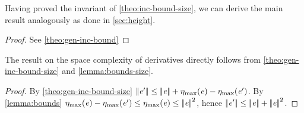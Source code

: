 Having proved the invariant of \cref{theo:inc-bound-size}, we can derive the main result analogously as done in \cref{sec:height}.
\begin{proof}
 See \cref{theo:gen-inc-bound}
\end{proof}

The result on the space complexity of derivatives directly follows from  \cref{theo:gen-inc-bound-size} and \cref{lemma:bounds-size}.


\begin{proof}
 By \cref{theo:gen-inc-bound-size} ${{\mid\!\mid}}{\mathit {e}'}{{\mid\!\mid}}\leq{{\mid\!\mid}}{\ensuremath{\mathit {e}}}{{\mid\!\mid}}+{\eta_{\max}}({\mathit {e}})-{\eta_{\max}}({\mathit {e}'})$. By \cref{lemma:bounds}
 ${\eta_{\max}}({\mathit {e}})-{\eta_{\max}}({\mathit {e}'})\leq{\eta_{\max}}({\mathit {e}})\leq{{\mid\!\mid}}{\ensuremath{\mathit {e}}}{{\mid\!\mid}}^2$, hence
 ${{\mid\!\mid}}{\mathit {e}'}{{\mid\!\mid}}\leq{{\mid\!\mid}}{\ensuremath{\mathit {e}}}{{\mid\!\mid}}+{{\mid\!\mid}}{\mathit {e}}{{\mid\!\mid}}^2$.
\end{proof}
